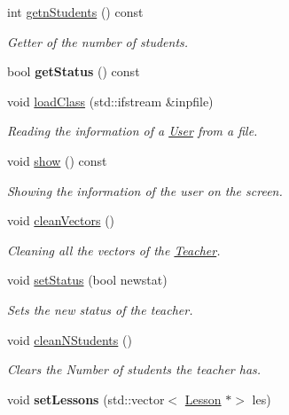 \begin{DoxyCompactItemize}
int \mbox{\hyperlink{class_teacher_a430db21f5ff329759302fbd35b6c365c}{getn\+Students}} () const
\begin{DoxyCompactList}\small\item\em Getter of the number of students. \end{DoxyCompactList}\item 
\mbox{\label{class_teacher_add422087b1f81cb38ad844634f5ca56c}} 
bool {\bfseries get\+Status} () const
\item 
void \mbox{\hyperlink{class_teacher_a1f204644af41c43ff3bd0582393062fa}{load\+Class}} (std\+::ifstream \&inpfile)
\begin{DoxyCompactList}\small\item\em Reading the information of a \mbox{\hyperlink{class_user}{User}} from a file. \end{DoxyCompactList}\item 
\mbox{\label{class_teacher_a1ea5c51b89ef4fe2098f4426217fc705}} 
void \mbox{\hyperlink{class_teacher_a1ea5c51b89ef4fe2098f4426217fc705}{show}} () const
\begin{DoxyCompactList}\small\item\em Showing the information of the user on the screen. \end{DoxyCompactList}\item 
\mbox{\label{class_teacher_ad8093070d9bf4c7663e4b7727576ab7a}} 
void \mbox{\hyperlink{class_teacher_ad8093070d9bf4c7663e4b7727576ab7a}{clean\+Vectors}} ()
\begin{DoxyCompactList}\small\item\em Cleaning all the vectors of the \mbox{\hyperlink{class_teacher}{Teacher}}. \end{DoxyCompactList}\item 
void \mbox{\hyperlink{class_teacher_a024a7daf22ee3ac310b69ba72fda5bb3}{set\+Status}} (bool newstat)
\begin{DoxyCompactList}\small\item\em Sets the new status of the teacher. \end{DoxyCompactList}\item 
\mbox{\label{class_teacher_a71778db05a63e32b33234bb7dcfb77fc}} 
void \mbox{\hyperlink{class_teacher_a71778db05a63e32b33234bb7dcfb77fc}{clean\+N\+Students}} ()
\begin{DoxyCompactList}\small\item\em Clears the Number of students the teacher has. \end{DoxyCompactList}\item 
\mbox{\label{class_teacher_a6c234671dbd738bee06f9a34bf11aca4}} 
void {\bfseries set\+Lessons} (std\+::vector$<$ \mbox{\hyperlink{class_lesson}{Lesson}} $\ast$$>$ les)
\end{DoxyCompactItemize}



